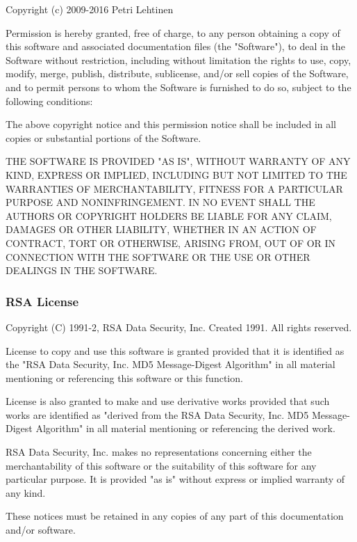 \begin{DoxyVerb}Copyright (c) 2009-2016 Petri Lehtinen

Permission is hereby granted, free of charge, to any person obtaining a copy
of this software and associated documentation files (the "Software"), to deal
in the Software without restriction, including without limitation the rights
to use, copy, modify, merge, publish, distribute, sublicense, and/or sell
copies of the Software, and to permit persons to whom the Software is
furnished to do so, subject to the following conditions:

The above copyright notice and this permission notice shall be included in
all copies or substantial portions of the Software.

THE SOFTWARE IS PROVIDED "AS IS", WITHOUT WARRANTY OF ANY KIND, EXPRESS OR
IMPLIED, INCLUDING BUT NOT LIMITED TO THE WARRANTIES OF MERCHANTABILITY,
FITNESS FOR A PARTICULAR PURPOSE AND NONINFRINGEMENT. IN NO EVENT SHALL THE
AUTHORS OR COPYRIGHT HOLDERS BE LIABLE FOR ANY CLAIM, DAMAGES OR OTHER
LIABILITY, WHETHER IN AN ACTION OF CONTRACT, TORT OR OTHERWISE, ARISING FROM,
OUT OF OR IN CONNECTION WITH THE SOFTWARE OR THE USE OR OTHER DEALINGS IN
THE SOFTWARE.
\end{DoxyVerb}
\hypertarget{aboutLicensesOSL_licenseOSRSA}{}\subsubsection{R\+S\+A License}\label{aboutLicensesOSL_licenseOSRSA}
\begin{DoxyVerb}Copyright (C) 1991-2, RSA Data Security, Inc. Created 1991. All rights reserved.

License to copy and use this software is granted provided that it is identified as the
"RSA Data Security, Inc. MD5 Message-Digest Algorithm" in all material mentioning or
referencing this software or this function.

License is also granted to make and use derivative works provided that such works are
identified as "derived from the RSA Data Security, Inc. MD5 Message-Digest Algorithm"
in all material mentioning or referencing the derived work.

RSA Data Security, Inc. makes no representations concerning either the merchantability
of this software or the suitability of this software for any particular purpose. It is
provided "as is"
without express or implied warranty of any kind.

These notices must be retained in any copies of any part of this documentation and/or
software.
\end{DoxyVerb}
